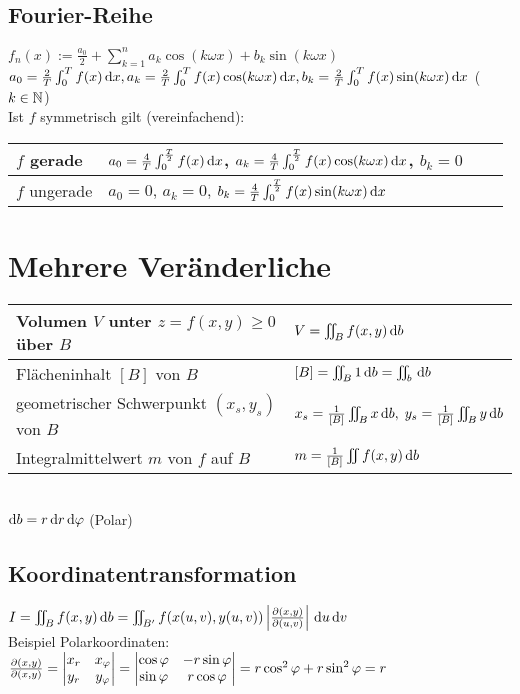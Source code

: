 \subsection{Fourier-Reihe}
$f_n(x):= \frac{a_0}{2}+\sum_{k=1}^n a_k \cos (k\omega x) + b_k \sin (k \omega x )$\\
$a_0 = \frac{2}{T}\int_0^T f(x) \,\mathrm{d}x,\\
a_k = \frac{2}{T}\int_0^T f(x) \cos (k \omega x) \,\mathrm{d}x, \\
b_k = \frac{2}{T} \int_0^T f(x) \sin (k \omega x) \,\mathrm{d}x$ \qquad ($k\in \mathbb{N}$)\\
Ist $f$ symmetrisch gilt (vereinfachend):\\
\begin{tabular}{l | l l l }
$f$ gerade & $a_0 = \frac{4}{T}\int_0^{\frac{T}{2}}f(x) \,\mathrm{d}x$, $ a_k = \frac{4}{T}\int_0^{\frac{T}{2}}f(x) \cos (k\omega x) \,\mathrm{d}x$, $ b_k =0$\\
\hline
$f$ ungerade & $a_0=0$, $a_k = 0$, $b_k = \frac{4}{T}\int_0^{\frac{T}{2}}f(x) \sin (k\omega x) \,\mathrm{d}x$
\end{tabular}  

\section{Mehrere Veränderliche}
\begin{tabular}{L{0.5} | L{0.4}}
Volumen $V$ unter $z=f(x,y)\geq 0$ über $B$ & $V=\iint_B f(x,y) \,\mathrm{d}b$\\
\hline
Flächeninhalt $[B]$ von $B$ & $[B]=\iint_B 1 \,\mathrm{d}b = \iint_b \,\mathrm{d}b$\\
\hline
geometrischer Schwerpunkt $(x_s, y_s)$ von $B$ & $x_s=\frac{1}{[B]}\iint_B x \,\mathrm{d}b, \; y_s=\frac{1}{[B]}\iint_B y \,\mathrm{d}b$\\
\hline 
Integralmittelwert $m$ von $f$ auf $B$ & $m=\frac{1}{[B]}\iint f(x,y) \,\mathrm{d}b$
\end{tabular}\\
$\mathrm{d}b = r\,\mathrm{d}r\,\mathrm{d}\varphi$ (Polar)

\subsection{Koordinatentransformation}
$I=\iint_B f(x,y) \,\mathrm{d}b= \iint_{B'}f(x(u,v), y(u,v)) \left| \frac{\partial (x,y)}{\partial (u,v)}\right| \,\mathrm{d}u\,\mathrm{d}v$ \\
Beispiel Polarkoordinaten: $\frac{\partial (x,y)}{\partial (x,y)}=\begin{vmatrix}x_r & x_\varphi \\ y_r & y_\varphi\end{vmatrix}=\begin{vmatrix}\cos \varphi & - r \sin \varphi \\ \sin \varphi & r \cos \varphi\end{vmatrix} = r \cos ^2\varphi + r \sin^2 \varphi = r$

